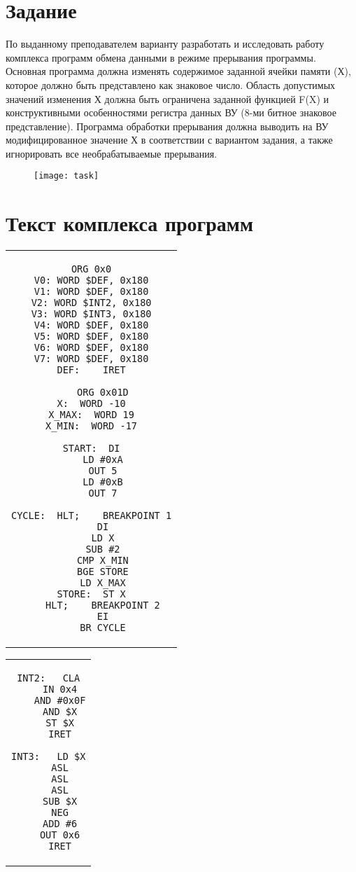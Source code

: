 \tableofcontents

\newpage

\section{Задание}
По выданному преподавателем варианту разработать и исследовать работу комплекса программ обмена данными в режиме прерывания программы. Основная программа должна изменять содержимое заданной ячейки памяти (Х), которое должно быть представлено как знаковое число. Область допустимых значений изменения Х должна быть ограничена заданной функцией F(X) и конструктивными особенностями регистра данных ВУ (8-ми битное знаковое представление). Программа обработки прерывания должна выводить на ВУ модифицированное значение Х в соответствии с вариантом задания, а также игнорировать все необрабатываемые прерывания.
\begin{figure}[H]
\centering
\texttt{[image: task]}
\label{pic:task}
\end{figure}

\section{Текст комплекса программ}
\begin{center}
\begin{tabular}{c}
\begin{lstlisting}[basicstyle=\ttfamily]
	ORG 0x0
V0:	WORD $DEF, 0x180
V1:	WORD $DEF, 0x180
V2:	WORD $INT2, 0x180
V3:	WORD $INT3, 0x180
V4:	WORD $DEF, 0x180
V5:	WORD $DEF, 0x180
V6:	WORD $DEF, 0x180
V7:	WORD $DEF, 0x180
DEF:	IRET

	ORG 0x01D
X:	WORD -10
X_MAX:	WORD 19
X_MIN:	WORD -17

START:	DI
	LD #0xA
	OUT 5
	LD #0xB
	OUT 7

CYCLE:	HLT;	BREAKPOINT 1
	DI
	LD X
	SUB #2
	CMP X_MIN
	BGE STORE
	LD X_MAX
STORE:	ST X
	HLT;	BREAKPOINT 2
	EI
	BR CYCLE
\end{lstlisting}
\end{tabular}
\end{center}

\begin{center}
\begin{tabular}{c}
\begin{lstlisting}[basicstyle=\ttfamily]
INT2:	CLA
	IN 0x4
	AND #0x0F
	AND $X
	ST $X
	IRET

INT3:	LD $X
	ASL
	ASL
	ASL
	SUB $X
	NEG
	ADD #6
	OUT 0x6
	IRET
\end{lstlisting}
\end{tabular}
\end{center}

